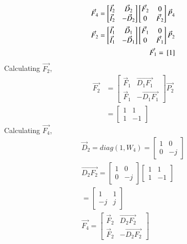 \documentclass[journal,12pt,twocolumn]{IEEEtran}
\renewcommand\thesection{\arabic{section}}
\begin{document}
\begin{enumerate}[label=\arabic*.,ref=\thesection.\theenumi]
\begin{solution}
\begin{align}
	\vec{F}_{4}=
	\begin{bmatrix}
	\vec{I}_{2} & \vec{D}_{2} \\
	\vec{I}_{2} & -\vec{D}_{2}
	\end{bmatrix}
	\begin{bmatrix}
	\vec{F}_{2} & 0 \\
	0 & \vec{F}_{2}
	\end{bmatrix}
	\vec{P}_{4}\\
	\vec{F}_{2}=
	\begin{bmatrix}
	\vec{I}_{1} & \vec{D}_{1} \\
	\vec{I}_{1} & -\vec{D}_{1}
	\end{bmatrix}
	\begin{bmatrix}
	\vec{F}_{1} & 0 \\
	0 & \vec{F}_{1}
	\end{bmatrix}
	\vec{P}_{2}\\
	\vec{F_1}={}\left[1\right]
	\end{align}
	Calculating $\vec{F_2}$,
\begin{align}
\vec{F_2}&=\begin{bmatrix}
\vec{F}_{1} & \vec{D_1F_1} \\
\vec{F}_{1} & -\vec{D_1F_1}
\end{bmatrix}\vec{P_2}\\
&=\begin{bmatrix}1&1\\1&-1\end{bmatrix}
\end{align}
Calculating $\vec{F_4}$,
\begin{align}
\vec{D}_{2}=diag(1,W_4)
=\begin{bmatrix}
1&0\\0&-j
\end{bmatrix}\\
\vec{D_2F_2}=\begin{bmatrix}
1&0\\0&-j
\end{bmatrix}\begin{bmatrix}
1&1\\1&-1
\end{bmatrix}\\
=\begin{bmatrix}
1&1\\-j&j
\end{bmatrix}\\
\vec{F_4}=\begin{bmatrix}
\vec{F}_{2} & \vec{D_2F_2} \\
\vec{F}_{2} & -\vec{D_2F_2}

\end{bmatrix}
\end{align}
\end{solution}
\end{enumerate}
\end{document}

